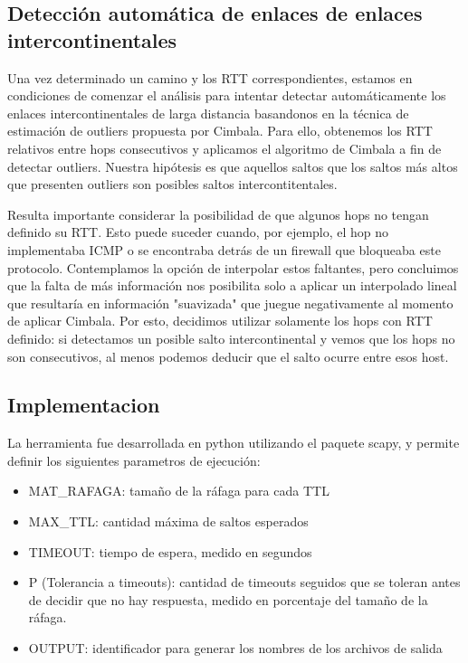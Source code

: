 \subsection{Detección automática de enlaces de enlaces intercontinentales}

Una vez determinado un camino y los RTT correspondientes, estamos en condiciones de comenzar el análisis para intentar detectar automáticamente los enlaces intercontinentales de larga distancia basandonos en la técnica de estimación de outliers propuesta por Cimbala. Para ello, obtenemos los RTT relativos entre hops consecutivos y aplicamos el algoritmo de Cimbala a fin de detectar outliers. Nuestra hipótesis es que aquellos saltos que los saltos más altos que presenten outliers son posibles saltos intercontitentales. 

Resulta importante  considerar la posibilidad de que algunos hops no tengan definido su RTT. Esto puede suceder cuando, por ejemplo, el hop no implementaba ICMP o se encontraba detrás de un firewall que bloqueaba este protocolo. Contemplamos la opción de interpolar estos faltantes, pero concluimos que la falta de más información nos posibilita solo a aplicar un interpolado lineal que resultaría en información "suavizada" que juegue negativamente al momento de aplicar Cimbala. Por esto, decidimos utilizar solamente los hops con RTT definido: si detectamos un posible salto intercontinental y vemos que los hops no son consecutivos, al menos podemos deducir que el salto ocurre entre esos host. 


\subsection{Implementacion}

La herramienta fue desarrollada en python utilizando el paquete scapy, y permite definir los siguientes parametros de ejecución:
\begin{itemize}
	\item{MAT\_RAFAGA: tamaño de la ráfaga para cada TTL}
	\item{MAX\_TTL: cantidad máxima de saltos esperados}
	\item{TIMEOUT: tiempo de espera, medido en segundos }
	\item{P (Tolerancia a timeouts): cantidad de timeouts seguidos que se toleran antes de decidir que no hay respuesta, medido en porcentaje del tamaño de la ráfaga.}
	\item{OUTPUT: identificador para generar los nombres de los archivos de salida}
\end{itemize}

